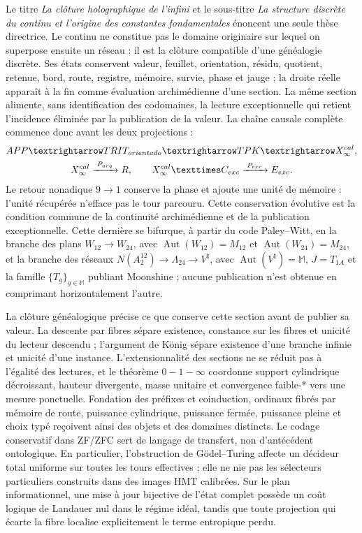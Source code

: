 Le titre \emph{La clôture holographique de l'infini} et le sous-titre
\emph{La structure discrète du continu et l'origine des constantes
fondamentales} énoncent une seule thèse directrice. Le continu ne constitue pas le
domaine originaire sur lequel on superpose ensuite un réseau : il est la
clôture compatible d'une généalogie discrète. Ses états conservent valeur,
feuillet, orientation, résidu, quotient, retenue, bord, route, registre, mémoire,
survie, phase et jauge ; la droite réelle apparaît à la fin comme évaluation
archimédienne d'une section. La même section alimente, sans identification des
codomaines, la lecture exceptionnelle qui retient l'incidence éliminée par la
publication de la valeur. La chaîne causale complète commence donc avant
les deux projections :
\[
\begin{gathered}
 \mathrm{APP}
 \longrightarrow \mathrm{TRIT}_{\rm orientado}
 \longrightarrow \mathrm{TPK}
 \longrightarrow \mathcal X_\infty^{\rm cal},\\
 \mathcal X_\infty^{\rm cal}
 \xrightarrow{\;\mathcal P_{\rm arq}\;}\mathbb R,
 \qquad
 \mathcal X_\infty^{\rm cal}\times\mathcal C_{\rm exc}
 \xrightarrow{\;\mathcal P_{\rm exc}\;}\mathcal E_{\rm exc}.
\end{gathered}
\]
Le retour nonadique \(9\to1\) conserve la phase et ajoute une unité de mémoire :
l'unité récupérée n'efface pas le tour parcouru. Cette conservation évolutive
est la condition commune de la continuité archimédienne et de la publication
exceptionnelle. Cette dernière se bifurque, à partir du code Paley--Witt, en la branche
des plans \(W_{12}\to W_{24}\), avec
\(\operatorname{Aut}(W_{12})=M_{12}\) et
\(\operatorname{Aut}(W_{24})=M_{24}\), et la branche des réseaux
\(N(A_2^{12})\to\Lambda_{24}\to V^\natural\), avec
\(\operatorname{Aut}(V^\natural)=\mathbb M\), \(J=T_{1A}\) et la famille
\(\{T_g\}_{g\in\mathbb M}\) publiant Moonshine ;
aucune publication n'est obtenue en comprimant horizontalement l'autre.

La clôture généalogique précise ce que conserve cette section avant de publier sa
valeur. La descente par fibres sépare existence, constance sur les fibres et
unicité du lecteur descendu ; l'argument de K\"onig sépare existence
d'une branche infinie et unicité d'une instance. L'extensionnalité des sections
ne se réduit pas à l'égalité des lectures, et le théorème \(0\!-1\!-\!\infty\)
coordonne support cylindrique décroissant, hauteur divergente, masse unitaire et
convergence faible-* vers une mesure ponctuelle. Fondation des préfixes et
coinduction, ordinaux fibrés par mémoire de route, puissance cylindrique,
puissance fermée, puissance pleine et choix typé reçoivent ainsi des objets et des
domaines distincts. Le codage conservatif dans ZF/ZFC sert de langage
de transfert, non d'antécédent ontologique. En particulier,
l'obstruction de G\"odel--Turing affecte un décideur total uniforme sur toutes
les tours effectives ; elle ne nie pas les sélecteurs particuliers construits dans des
images HMT calibrées. Sur le plan informationnel, une mise à jour
bijective de l'état complet possède un coût logique de Landauer nul dans le régime
idéal, tandis que toute projection qui écarte la fibre localise
explicitement le terme entropique perdu.

